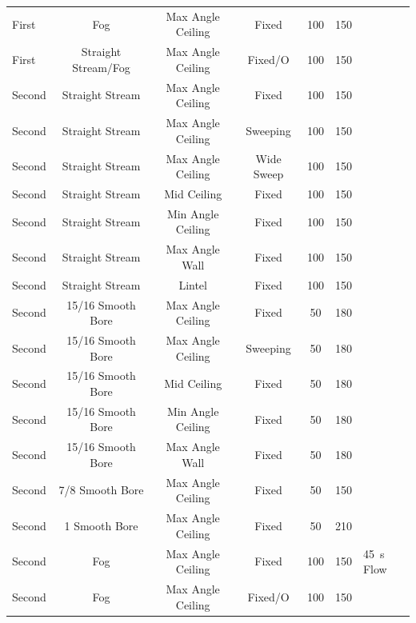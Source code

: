 \documentclass[12pt,oneside]{book}
\begin{document}
\begin{table}[!ht]
\begin{tabular}{lcccccl}
First  & Fog                & Max Angle Ceiling      & Fixed        	& 100 & 150 &   \\
First  & Straight Stream/Fog & Max Angle Ceiling    & Fixed/O           & 100 & 150 &   \\
\midrule
Second & Straight Stream    & Max Angle Ceiling      & Fixed                   & 100 & 150 &   \\
Second & Straight Stream    & Max Angle Ceiling      & Sweeping                & 100 & 150 &   \\
Second & Straight Stream    & Max Angle Ceiling      & Wide Sweep              & 100 & 150 &   \\
Second & Straight Stream    & Mid Ceiling            & Fixed                   & 100 & 150 &   \\
Second & Straight Stream    & Min Angle Ceiling      & Fixed                   & 100 & 150 &   \\
Second & Straight Stream    & Max Angle Wall         & Fixed                   & 100 & 150 &   \\
Second & Straight Stream    & Lintel         		 & Fixed                   & 100 & 150 &   \\
Second & 15/16 Smooth Bore  & Max Angle Ceiling      & Fixed                   & 50 & 180 &   \\
Second & 15/16 Smooth Bore  & Max Angle Ceiling      & Sweeping       	       & 50 & 180 &   \\
Second & 15/16 Smooth Bore  & Mid Ceiling            & Fixed                   & 50 & 180 &   \\
Second & 15/16 Smooth Bore  & Min Angle Ceiling      & Fixed                   & 50 & 180 &   \\
Second & 15/16 Smooth Bore  & Max Angle Wall         & Fixed                   & 50 & 180 &   \\
Second & 7/8 Smooth Bore    & Max Angle Ceiling      & Fixed                   & 50 & 150 &   \\
Second & 1 Smooth Bore      & Max Angle Ceiling      & Fixed                   & 50 & 210 &   \\
Second & Fog                & Max Angle Ceiling      & Fixed                   & 100 & 150 & 45~s Flow \\
Second & Fog                & Max Angle Ceiling      & Fixed/O                 & 100 & 150 &   \\
\bottomrule[1.25pt]
\end{tabular}
\end{table}
\end{document}
